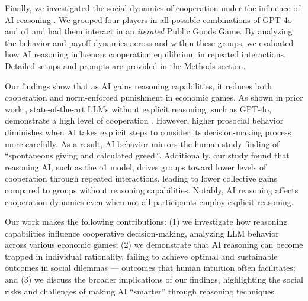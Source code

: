 Finally, we investigated the social dynamics of cooperation under the influence of AI reasoning \cite{nowak2006evolutionary}. 
We grouped four players in all possible combinations of GPT-4o and o1 and had them interact in an \textit{iterated} Public Goods Game.
By analyzing the behavior and payoff dynamics across and within these groups, we evaluated how AI reasoning influences cooperation equilibrium in repeated interactions.
Detailed setups and prompts are provided in the Methods section.

Our findings show that as AI gains reasoning capabilities, it reduces both cooperation and norm-enforced punishment in economic games. 
As shown in prior work \cite{fontana2024nicer, wu2024shall, vallinder2024cultural}, state-of-the-art LLMs without explicit reasoning, such as GPT-4o, demonstrate a high level of cooperation . 
However, higher prosocial behavior diminishes when AI takes explicit steps to consider its decision-making process more carefully. 
As a result, AI behavior mirrors the human-study finding of ``spontaneous giving and calculated greed.''\cite{rand2012spontaneous}. 
Additionally, our study found that reasoning AI, such as the o1 model, drives groups toward lower levels of cooperation through repeated interactions, leading to lower collective gains compared to groups without reasoning capabilities.
Notably, AI reasoning affects cooperation dynamics even when not all participants employ explicit reasoning.

Our work makes the following contributions: (1) we investigate how reasoning capabilities influence cooperative decision-making, analyzing LLM behavior across various economic games; (2) we demonstrate that AI reasoning can become trapped in individual rationality, failing to achieve optimal and sustainable outcomes in social dilemmas --- outcomes that human intuition often facilitates; and (3) we discuss the broader implications of our findings, highlighting the social risks and challenges of making AI “smarter” through reasoning techniques.